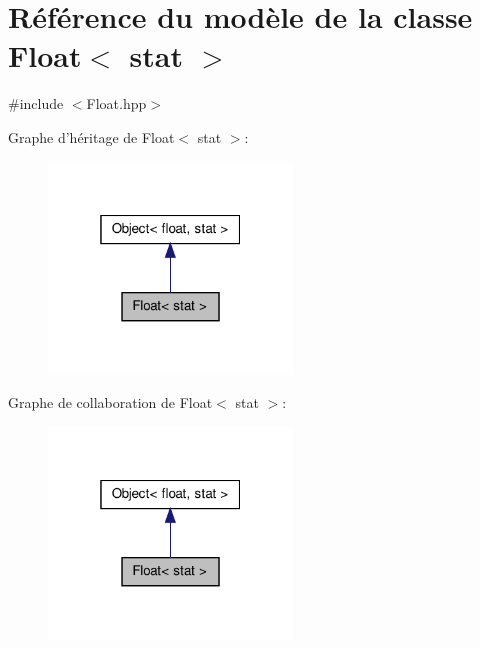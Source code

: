 \hypertarget{class_float}{\section{Référence du modèle de la classe Float$<$ stat $>$}
\label{class_float}
}


{\ttfamily \#include $<$Float.\-hpp$>$}



Graphe d'héritage de Float$<$ stat $>$\-:\nopagebreak
\begin{figure}[H]
\begin{center}
\leavevmode
\includegraphics[width=184pt]{class_float__inherit__graph}
\end{center}
\end{figure}


Graphe de collaboration de Float$<$ stat $>$\-:\nopagebreak
\begin{figure}[H]
\begin{center}
\leavevmode
\includegraphics[width=184pt]{class_float__coll__graph}
\end{center}
\end{figure}
